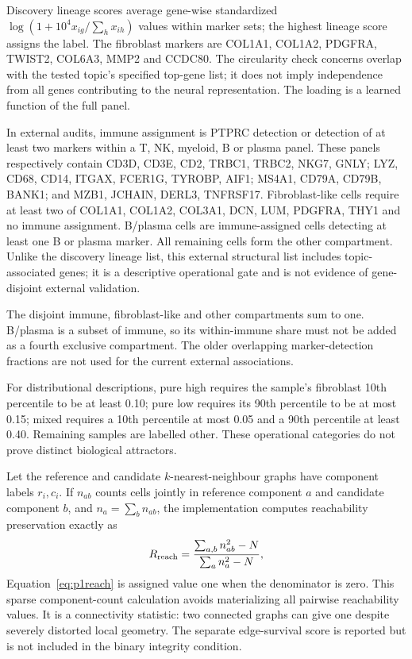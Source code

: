 Discovery lineage scores average gene-wise standardized $\log(1+10^4x_{ig}/\sum_hx_{ih})$ values within marker sets; the highest lineage score assigns the label. The fibroblast markers are COL1A1, COL1A2, PDGFRA, TWIST2, COL6A3, MMP2 and CCDC80. The circularity check concerns overlap with the tested topic's specified top-gene list; it does not imply independence from all genes contributing to the neural representation. The loading is a learned function of the full panel.

In external audits, immune assignment is PTPRC detection or detection of at least two markers within a T, NK, myeloid, B or plasma panel. These panels respectively contain CD3D, CD3E, CD2, TRBC1, TRBC2, NKG7, GNLY; LYZ, CD68, CD14, ITGAX, FCER1G, TYROBP, AIF1; MS4A1, CD79A, CD79B, BANK1; and MZB1, JCHAIN, DERL3, TNFRSF17. Fibroblast-like cells require at least two of COL1A1, COL1A2, COL3A1, DCN, LUM, PDGFRA, THY1 and no immune assignment. B/plasma cells are immune-assigned cells detecting at least one B or plasma marker. All remaining cells form the other compartment. Unlike the discovery lineage list, this external structural list includes topic-associated genes; it is a descriptive operational gate and is not evidence of gene-disjoint external validation.

The disjoint immune, fibroblast-like and other compartments sum to one. B/plasma is a subset of immune, so its within-immune share must not be added as a fourth exclusive compartment. The older overlapping marker-detection fractions are not used for the current external associations.

For distributional descriptions, pure high requires the sample's fibroblast 10th percentile to be at least 0.10; pure low requires its 90th percentile to be at most 0.15; mixed requires a 10th percentile at most 0.05 and a 90th percentile at least 0.40. Remaining samples are labelled other. These operational categories do not prove distinct biological attractors.

Let the reference and candidate $k$-nearest-neighbour graphs have component labels $r_i,c_i$. If $n_{ab}$ counts cells jointly in reference component $a$ and candidate component $b$, and $n_a=\sum_bn_{ab}$, the implementation computes reachability preservation exactly as
\begin{equation}
R_{\rm reach}=\frac{\sum_{a,b}n_{ab}^2-N}{\sum_an_a^2-N},\label{eq:p1reach}
\end{equation}
Equation~\eqref{eq:p1reach} is assigned value one when the denominator is zero. This sparse component-count calculation avoids materializing all pairwise reachability values. It is a connectivity statistic: two connected graphs can give one despite severely distorted local geometry. The separate edge-survival score is reported but is not included in the binary integrity condition.


